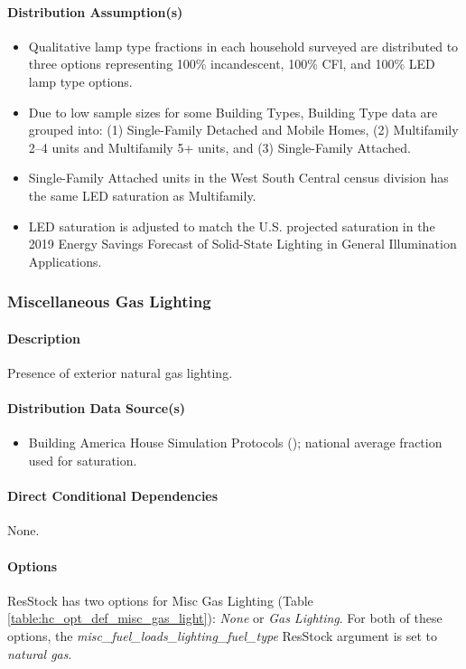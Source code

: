\paragraph{Distribution Assumption(s)}\label{assumption-67}

\begin{itemize}
 
\item
  Qualitative lamp type fractions in each household surveyed are
  distributed to three options representing 100\% incandescent, 100\%
  CFl, and 100\% LED lamp type options.
\item
  Due to low sample sizes for some Building Types, Building Type data
  are grouped into: (1) Single-Family Detached and Mobile Homes, (2)
  Multifamily 2--4 units and Multifamily 5+ units, and (3) Single-Family
  Attached.
\item
  Single-Family Attached units in the West South Central census division
  has the same LED saturation as Multifamily.
\item
  LED saturation is adjusted to match the U.S. projected saturation in
  the 2019 Energy Savings Forecast of Solid-State Lighting in General
  Illumination Applications.
\end{itemize}

\subsubsection{Miscellaneous Gas Lighting}\label{misc_gas_lighting}
\paragraph{Description}
Presence of exterior natural gas lighting.
\paragraph{Distribution Data Source(s)}
\begin{itemize}
 
\item
 Building America House Simulation Protocols (\cite{Wilson2014}); national average fraction used for saturation.
\end{itemize}
\paragraph{Direct Conditional Dependencies}
None.
\paragraph{Options}
ResStock has two options for Misc Gas Lighting (Table \ref{table:hc_opt_def_misc_gas_light}): \textit{None} or \textit{Gas Lighting}. For both of these options, the \textit{misc\_fuel\_loads\_lighting\_fuel\_type} ResStock argument is set to \textit{natural gas}.

